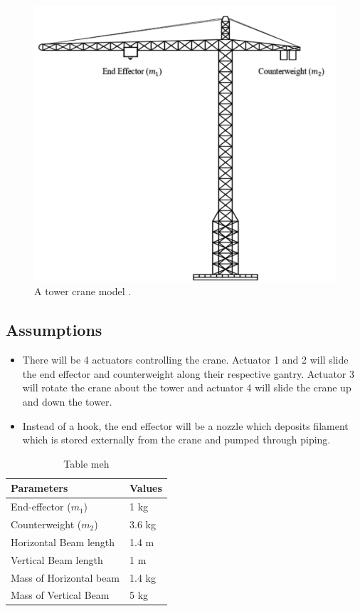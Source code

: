 \documentclass{UoNMCHA}
\numberwithin{equation}{section}
\begin{document}
	\begin{figure}[H]
		\begin{center}
			\includegraphics[width=.8\linewidth]{figs/Picture5}
			\caption{A tower crane model \cite{crane}.}
			\label{figs/Picture5}
		\end{center}
	\end{figure}
	
	\subsection{Assumptions}
	\begin{itemize}
		\item There will be 4 actuators controlling the crane. Actuator 1 and 2 will slide the end effector and counterweight along their respective gantry. Actuator 3 will rotate the crane about the tower and actuator 4 will slide the crane up and down the tower. 
		\item Instead of a hook, the end effector will be a nozzle which deposits filament which is stored externally from the crane and pumped through piping.
		
	\end{itemize}
	
	
	\begin{table}[H] \centering 
		\caption{Table meh}
		\begin{tabular}{ll}
			\hline
			Parameters              & Values \\ \hline 
			End-effector ($ m_1 $)     & 1 kg   \\ 
			Counterweight ($ m_2 $)    & 3.6 kg \\ 
			Horizontal Beam length  & 1.4 m  \\ 
			Vertical Beam length    & 1 m    \\ 
			Mass of Horizontal beam & 1.4 kg \\ 
			Mass of Vertical Beam   & 5 kg  
		\end{tabular}
		\label{tab:physical param}
	\end{table}
	
\end{document}
